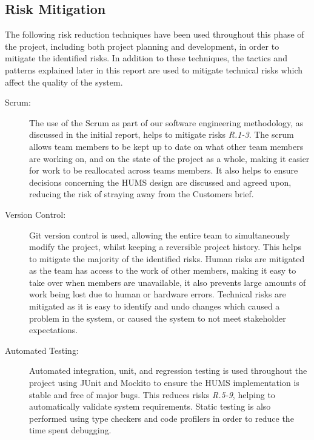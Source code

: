 \documentclass[10pt,a4paper]{article}
\begin{document}
\subsection{Risk Mitigation}
The following risk reduction techniques have been used throughout this phase of the project, including both project planning and development, in order to mitigate the identified risks. In addition to these techniques, the tactics and patterns explained later in this report are used to mitigate technical risks which affect the quality of the system.
\begin{description}
\item[Scrum:]
The use of the Scrum as part of our software engineering methodology, as discussed in the initial report, helps to mitigate risks \emph{R.1-3}. The scrum allows team members to be kept up to date on what other team members are working on, and on the state of the project as a whole, making it easier for work to be reallocated across teams members. It also helps to ensure decisions concerning the HUMS design are discussed and agreed upon, reducing the risk of straying away from the Customers brief.

\item[Version Control:]
Git version control is used, allowing the entire team to simultaneously modify the project, whilst keeping a reversible project history. This helps to mitigate the majority of the identified risks. Human risks are mitigated as the team has access to the work of other members, making it easy to take over when members are unavailable, it also prevents large amounts of work being lost due to human or hardware errors. Technical risks are mitigated as it is easy to identify and undo changes which caused a problem in the system, or caused the system to not meet stakeholder expectations.

\item[Automated Testing:] 
Automated integration, unit, and regression testing is used throughout the project using JUnit and Mockito to ensure the HUMS implementation is stable and free of major bugs. This reduces risks \emph{R.5-9}, helping to automatically validate system requirements. 
Static testing is also performed using type checkers and code profilers in order to reduce the time spent debugging.
\end{description}

\end{document}

